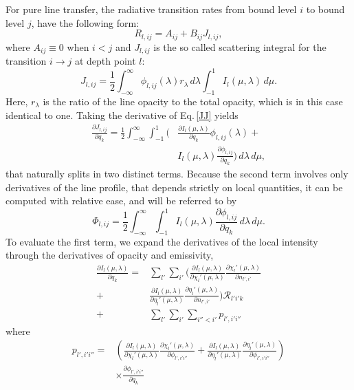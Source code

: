 \documentclass[referee]{aa}
\begin{document}
For pure line transfer, the radiative transition rates from bound level $i$ to bound level $j$, have the following form:
\begin{equation}
 R_{l,ij} = A_{ij} + B_{ij} J_{l,ij},
\end{equation}
where $A_{ij} \equiv 0$ when $i<j$ and $J_{l,ij}$ is the so called scattering integral for the transition $i\rightarrow j$ at depth point $l$:
\begin{equation}
 J_{l,ij} = \frac{1}{2} \int_{-\infty}^{\infty} \phi_{l,ij}(\lambda) r_{\lambda}\,d\lambda \int_{-1}^{1} I_l(\mu,\lambda)\,d\mu. 
 \label{JJ}
\end{equation}
Here, $r_{\lambda}$ is the ratio of the line opacity to the total opacity, which is in this case identical to one. Taking the derivative of Eq.\,\ref{JJ} yields
\begin{align}
 \frac{\partial J_{l,ij}}{\partial q_k} = \frac{1}{2} \int_{-\infty}^{\infty} \int_{-1}^{1} ( & \frac{\partial I_l(\mu,\lambda)}{\partial q_k} \phi_{l,ij}(\lambda) + \nonumber \\
 & I_l(\mu,\lambda) \frac{\partial \phi_{l,ij}}{\partial q_k} )\,d\lambda\,d\mu,
 \label{JJ2}
\end{align}
that naturally splits in two distinct terms. Because the second term involves only derivatives of the line profile, that depends strictly on local quantities, it can be computed with relative ease, and will be referred to by
\begin{equation}
\Phi_{l,ij} = \frac{1}{2} \int_{-\infty}^{\infty} \int_{-1}^{1} I_l(\mu,\lambda) \frac{\partial \phi_{l,ij}}{\partial q_k}\,d\lambda\,d\mu.
\end{equation}
To evaluate the first term, we expand the derivatives of the local intensity through the derivatives of opacity and emissivity,
\begin{align}
\frac{\partial I_l(\mu,\lambda)}{\partial q_k} = & \sum_{l'} \sum_{i'} ( \frac{\partial I_l(\mu,\lambda)}{\partial \chi_l'(\mu,\lambda)} \frac{\partial \chi_l'(\mu,\lambda)}{\partial n_{l',i'}} \nonumber \\
+& \frac{\partial I_l(\mu,\lambda)}{\partial \eta_l'(\mu,\lambda)} \frac{\partial \eta_l'(\mu,\lambda)}{\partial n_{l',i'}} ) {\mathcal R}_{l'i'k} \nonumber \\
+&  \sum_{l'} \sum_{i'} \sum_{i''<i'}  p_{l',i'i''}
\end{align}
where 
\begin{align}
 p_{l',i'i''} = &\left ( \frac{\partial I_l(\mu,\lambda)}{\partial \chi_l'(\mu,\lambda)} \frac{\partial \chi_l'(\mu,\lambda)}{\partial \phi_{l',i'i''}} + 
\frac{\partial I_l(\mu,\lambda)}{\partial \eta_l'(\mu,\lambda)} \frac{\partial \eta_l'(\mu,\lambda)}{\partial \phi_{l',i'i''}} \right )\nonumber \\
&\times \frac{\partial \phi_{l',i'i''}}{\partial q_k}
 \label{derI_inconcise}
\end{align}
\end{document}
